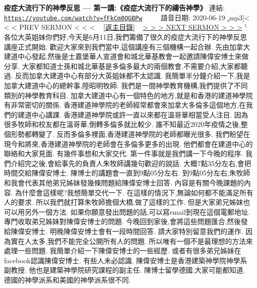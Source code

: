 \documentclass{book}
\begin{document}
\section{}
\label{sec:fFkCm0QGBPw}
\textbf{疫症大流行下的神學反思 --- 第一講:《疫症大流行下的禱告神學》}
\newline
\newline
連結: \href{https://youtube.com/watch?v=fFkCm0QGBPw}{\texttt{https://youtube.com/watch?v=fFkCm0QGBPw}} ~~~~ 語音日期: 2020-06-19
\newline
\newline
\hyperref[sec:t3iF4o].mp3]{\small{< < < PREV SERMON < < <}}
~
\hyperref[sec:index]{\small{[返主目錄]}}
~
\hyperref[sec:yb30yQHiYdM]{\small{> > > NEXT SERMON > > >}}
\newline
\newline
$^{1}$各位大英姐妹你們好,今天是6月11日,我們籌備了很久的疫症大流行下的神學反思講座正式開始.
歡迎大家來到我們當中,這個講座有三個機構一起合辦.
先由加拿大建道中心發起,然後是士嘉堡華人宣道會和城北華基教會一起邀請陳偉安博士來做分享.
大家都知道士孫和城北華基是多倫多最大的兩個教會,不需要介紹,大家都聽過.
反而加拿大建道中心有部分大英姐妹都不太認識.
我簡單半分鐘介紹一下,我是加拿大建道中心的總幹事,陸昭明牧師.
我們是一間神學教育機構,我們提供了不同類別的神學教育科目.
加拿大建道中心有一個特色的地方,就是和香港的建道神學院有非常密切的關係.
香港建道神學院的老師經常都會來加拿大多倫多這個地方,在我們的建道中心講課.
香港建道神學院或許一直以來都在溫哥華相當受人注目.
因為很多牧師和校友都在溫哥華,倒轉多倫多就比較少.
誰不知最近2020年疫情之後,整個形勢都轉變了.
反而多倫多裡面,香港建道神學院的老師都曝光很多.
我們盼望在現今和將來,香港建道神學院的老師會在多倫多更多的出現.
他們都會在建道中心的聯絡和大家見面.
有幾件事想和大家交代.
第一件事就是我們講一下今晚的程序.
我們介紹完之後,會給事先的負責人朱牧師講幾句歡迎的說話.
大概7點35分左右,會把時間交給陳偉安博士.
陳博士的講題會一直到9點05分左右.
到9點05分左右,朱牧師和我會代表其他弟兄姊妹發幾條問題給陳偉安博士回答.
內容是有關今晚課題的內容.
為什麼會這樣呢?我想簡單交代一下.
在這樣的情況下,無論如何都不能滿足所有人的要求.
所以我們就打算朱牧師擔個大橋,做了這樣的工作.
但是大家弟兄姊妹也可以用另外一個方法.
如果你願意發出問題的話,可以寫email到現在這個電郵地址.
專門收取弟兄姊妹對陳偉安博士的問題.
今晚回到家後,會將這些問題匯合,然後發給陳偉安博士.
明晚陳偉安博士會有一段時間回答.
請大家特別留意我們的運作.
因為實在人太多,我們不能完全公開所有人的問題.
所以唯有一個不是最理想的方法來處理一些問題.
我簡單介紹一下陳偉安博士的一些經歷.
或者有很多弟兄姊妹在facebook認識陳偉安博士.
有些人未必認識.
陳偉安博士是香港建築神學院神學系副教授.
他也是建築神學院研究課程的副主任.
陳博士留學德國,大家可能都知道.
德國的神學派系和美國的神學派系很不同.
\end{document}

